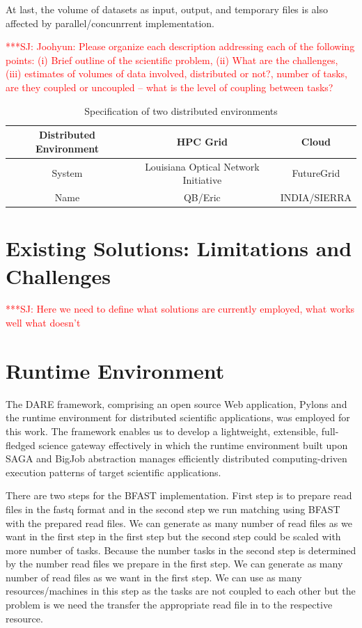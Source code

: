 \documentclass[12pt]{article}
\newcommand{\jhanote}[1]{ {\textcolor{red}     {***SJ: #1}}}
\newcommand{\jhanote}[1]{}
\begin{document}
At last, the volume of datasets as input, output, and temporary files is also affected by parallel/concunrrent implementation.




\jhanote{Joohyun: Please organize each description addressing each of
  the following points: (i) Brief outline of the scientific problem,
  (ii) What are the challenges, (iii) estimates of volumes of data
  involved, distributed or not?, number of tasks, are they coupled or
  uncoupled -- what is the level of coupling between tasks?}


 \begin{table}
 \begin{tabular}{|c|cc|} 
 \hline 
Distributed Environment &  HPC Grid &  Cloud \\ \hline
System  &  Louisiana Optical Network Initiative & FutureGrid \\
Name &  QB/Eric   &  INDIA/SIERRA \\
 \hline
 \end{tabular}
\caption{Specification of two distributed environments}
\label{table:two-systems} 
\end{table}
 
\section{Existing Solutions: Limitations and Challenges}

\jhanote{Here we need to define what solutions are currently employed, what works well
  what doesn't}

\section{Runtime Environment}

The DARE framework, comprising an open source Web application, Pylons
and the runtime environment for distributed scientific applications,
was employed for this work.  The framework enables us to develop a
lightweight, extensible, full-fledged science gateway effectively in
which the runtime environment built upon SAGA and BigJob abstraction
manages efficiently distributed computing-driven execution patterns of
target scientific applications.

There are two steps for the BFAST implementation. First step is to prepare read files in the 
fastq format and in the second step we run matching using BFAST with the prepared read files.
 We can generate as many number of read files as we want in the first step in the first step
 but the second step could be scaled with more number of tasks. Because the number tasks 
 in the second step is determined by the number read files we prepare in the first step. We 
 can generate as many number of read files as we want in the first step. We can use as many resources/machines 
 in this step as the tasks are not coupled to each other but the problem is we need the transfer the appropriate read file
in to the respective resource.
\end{document}
